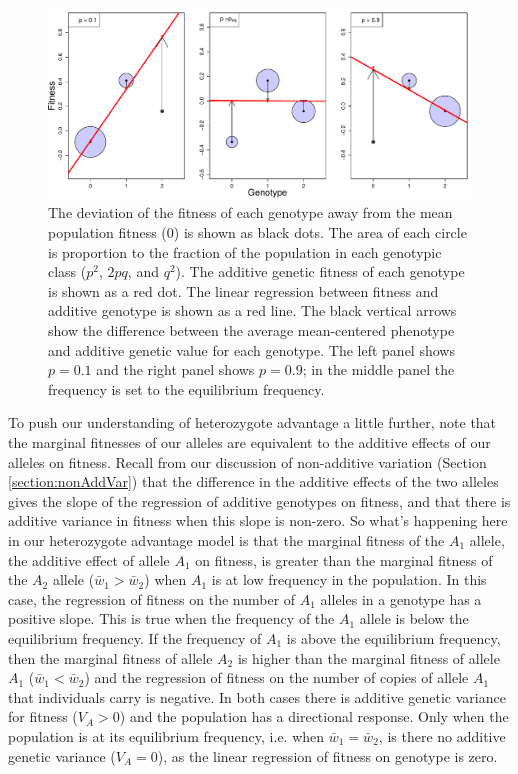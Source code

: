 \begin{figure}
\begin{center}
  \includegraphics[width = \textwidth]{figures/additive_effect_OverDom.pdf}
\end{center}
\caption{The deviation of the fitness of each genotype away from the mean population
  fitness (0) is shown as black dots. The area of each circle is proportion to the fraction of
the population in each genotypic class ($p^2$, $2pq$, and $q^2$). The
additive genetic fitness of each genotype is shown as
 a red dot. The linear regression between fitness and additive
 genotype is shown as a red line. The black vertical arrows show the
 difference between the average mean-centered phenotype and additive genetic value for each genotype.
The left panel shows $p=0.1$ and the right panel shows $p=0.9$; in the
middle panel the frequency is set to the equilibrium frequency.  } \label{fig:additive_effect_OverDom}
\end{figure}


To push our understanding of heterozygote advantage a little further, note that the marginal fitnesses of our alleles are equivalent to the additive effects of our alleles on fitness. Recall from our discussion of non-additive variation (Section \ref{section:nonAddVar}) that the difference in the additive effects of the two alleles gives the slope of the regression of additive genotypes on fitness, and that there is additive variance in fitness
when this slope is non-zero.  
So what's happening here in our heterozygote advantage model is that the marginal fitness of the $A_1$ allele, the additive effect of allele $A_1$ on fitness, is greater than the marginal fitness of the $A_2$ allele ($\bar{w}_1 > \bar{w}_2 $) when $A_1$ is at low frequency in the population. In this case, the regression of fitness on the number of $A_1$ alleles in a genotype has a positive slope. This is true when the
frequency of the $A_1$ allele is below the equilibrium frequency. If the frequency of $A_1$ is above the equilibrium frequency, then
the marginal fitness of allele $A_2$ is higher than the marginal fitness of allele $A_1$ ($\bar{w}_1 < \bar{w}_2 $) and the regression of fitness on the number of copies of allele $A_1$ that individuals carry is negative. In both cases there is additive genetic variance for fitness ($V_A > 0$) and the population has a directional response. Only when the population is at its equilibrium frequency, i.e. when $\bar{w}_1 =
\bar{w}_2$, is there no additive genetic variance  ($V_A = 0$), as the linear regression of fitness on genotype is zero. 



